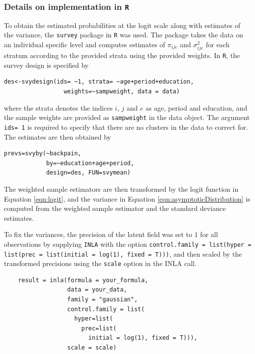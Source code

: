 \subsubsection{Details on implementation in \texttt{R}}
\label{appendix:A2:implementaion}
To obtain the estimated probabilities at the logit scale along with estimates of the variance, the \texttt{survey} package in \texttt{R} was used. The package takes the data on an individual specific level and computes estimates of $\pi_{ije}$ and $\sigma^2_{ije}$ for each stratum according to the provided strata using the provided weights. In \texttt{R}, the survey design is specified by
\begin{lstlisting}
des<-svydesign(ids= ~1, strata= ~age+period+education,
                 weights=~sampweight, data = data)
\end{lstlisting}
where the strata denotes the indices $i$, $j$ and $e$ as age, period and education, and the sample weights are provided as \texttt{sampweight} in the data object. The argument \texttt{ids=~1} is required to specify that there are no clusters in the data to correct for. The estimates are then obtained by
\begin{lstlisting}
prevs=svyby(~backpain, 
            by=~education+age+period,
            design=des, FUN=svymean)
\end{lstlisting}
The weighted sample estimators are then transformed by the logit function in Equation \eqref{eqn:logit}, and the variance in Equation \eqref{eqn:asymptoticDistribution} is computed from the weighted sample estimator and the standard deviance estimates. 

To fix the variances, the precision of the latent field was set to $1$ for all observations by supplying \texttt{INLA} with the option \texttt{control.family = list(hyper = list(prec = list(initial = log(1), fixed = T)))}, and then scaled by the transformed precisions using the \texttt{scale} option in the INLA call.

\begin{lstlisting}
    result = inla(formula = your_formula, 
                  data = your_data, 
                  family = "gaussian", 
                  control.family = list(
                    hyper=list(
                      prec=list(
                        initial = log(1), fixed = T))),
                  scale = scale)
\end{lstlisting}






